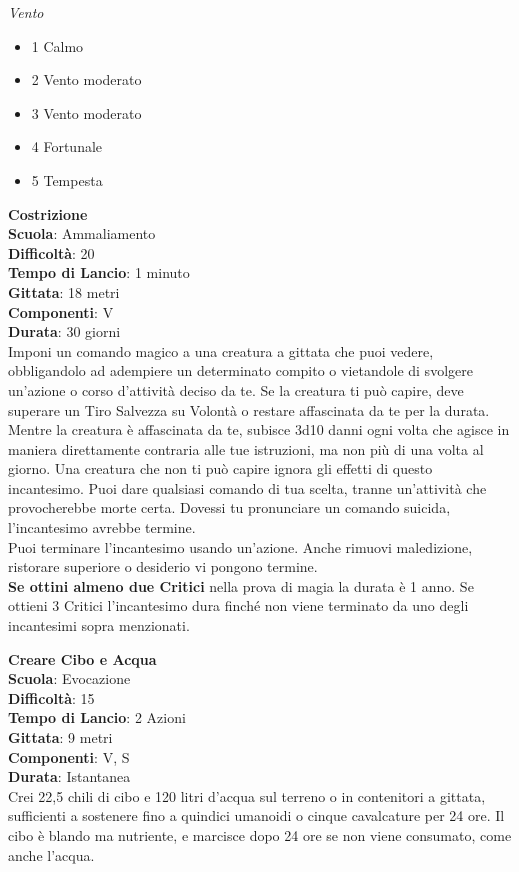 \begin{multicols}{2}
\textit{Vento}
\begin{itemize}
	\item 
1 Calmo
	\item 
2 Vento moderato
	\item 
3 Vento moderato
	\item 
4 Fortunale
	\item 
5 Tempesta
\end{itemize}

\medskip\textbf{Costrizione}\\
\textbf{Scuola}: Ammaliamento\\
\textbf{Difficoltà}: 20\\
\textbf{Tempo di Lancio}: 1 minuto\\
\textbf{Gittata}: 18 metri\\
\textbf{Componenti}: V\\
\textbf{Durata}: 30 giorni\\
Imponi un comando magico a una creatura a gittata che puoi vedere, obbligandolo ad adempiere un determinato compito o vietandole di svolgere un'azione o corso d'attività deciso da te. Se la creatura ti può capire, deve superare un Tiro Salvezza su Volontà o restare affascinata da te per la durata. Mentre la creatura è affascinata da te, subisce 3d10 danni ogni volta che agisce in maniera direttamente contraria alle tue istruzioni, ma non più di una volta al giorno. Una creatura che non ti può capire ignora gli effetti di questo incantesimo. Puoi dare qualsiasi comando di tua scelta, tranne un'attività che provocherebbe morte certa. Dovessi tu pronunciare un comando suicida, l'incantesimo avrebbe termine.\\
Puoi terminare l'incantesimo usando un'azione. Anche rimuovi maledizione, ristorare superiore o desiderio vi pongono termine.\\
\textbf{Se ottini almeno due Critici} nella prova di magia la durata è 1 anno. Se ottieni 3 Critici l'incantesimo dura finché non viene terminato da uno degli incantesimi sopra menzionati.

\medskip\textbf{Creare Cibo e Acqua}\\
\textbf{Scuola}: Evocazione\\
\textbf{Difficoltà}: 15\\
\textbf{Tempo di Lancio}: 2 Azioni\\
\textbf{Gittata}: 9 metri\\
\textbf{Componenti}: V, S\\
\textbf{Durata}: Istantanea\\
Crei 22,5 chili di cibo e 120 litri d'acqua sul terreno o in contenitori a gittata, sufficienti a sostenere fino a quindici umanoidi o cinque cavalcature per 24 ore. Il cibo è blando ma nutriente, e marcisce dopo 24 ore se non viene consumato, come anche l'acqua.


\end{multicols}
